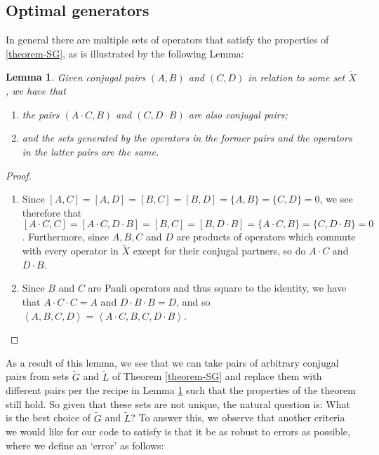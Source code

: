 \documentclass[twocolumn,showpacs,preprintnumbers,amsmath,amssymb,nofootinbib,pra,floatfix]{revtex4}
\newtheorem{lemma}{Lemma}
\newcommand{\set}{\tilde}
\begin{document}
\subsection{Optimal generators}

\label{optimal-generators}

In general there are multiple sets of operators that satisfy the properties of \ref{theorem-SG}, as is illustrated by the following Lemma:

\begin{lemma}
\label{combining-pairs}
Given conjugal pairs $(A,B)$ and $(C,D)$ in relation to some set $\set X$, we have that
\begin{enumerate}
\item the pairs $(A\cdot C,B)$ and $(C,D\cdot B)$ are also conjugal pairs;
\item and the sets generated by the operators in the former pairs and the operators in the latter pairs are the same.
\end{enumerate}
\end{lemma}

\begin{proof}
\begin{enumerate}
\item Since $[A,C]=[A,D]=[B,C]=[B,D]=\{A,B\}=\{C,D\}=0$, we see therefore that $[A\cdot C,C]=[A\cdot C,D\cdot B]=[B,C]=[B,D\cdot B]=\{A\cdot C,B\}=\{C,D\cdot B\}=0$.  Furthermore, since $A,B,C$ and $D$ are products of operators which commute with every operator in $\set X$ except for their conjugal partners, so do $A\cdot C$ and $D\cdot B$.
\item Since $B$ and $C$ are Pauli operators and thus square to the identity, we have that $A\cdot C\cdot C=A$ and $D\cdot B\cdot B=D$, and so $\left<A,B,C,D\right> =\left<A\cdot C,B,C,D\cdot B\right>$.
\end{enumerate}
\end{proof}

As a result of this lemma, we see that we can take pairs of arbitrary conjugal pairs from sets $\set G$ and $\set L$ of Theorem \ref{theorem-SG} and replace them with different pairs per the recipe in Lemma \ref{combining-pairs} such that the properties of the theorem still hold.  So given that these sets are not unique, the natural question is:  What is the best choice of $\set G$ and $\set L$?  To answer this, we observe that another criteria we would like for our code to satisfy is that it be as robust to errors as possible, where we define an `error' as follows:
\end{document}
